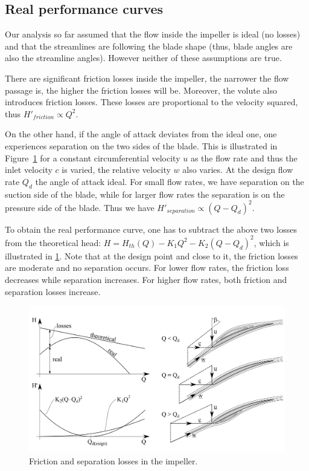 

\clearpage

\subsection{Real performance curves} \label{sec:real_performance_curves_turbomachines}

Our analysis so far assumed that the flow inside the impeller is ideal (no losses) and that the streamlines are following the blade shape (thus, blade angles are also the streamline angles). However neither of these assumptions are true.

There are significant friction losses inside the impeller, the narrower the flow passage is, the higher the friction losses will be. Moreover, the volute also introduces friction losses. These losses are proportional to the velocity squared, thus $H'_{friction} \propto Q^2$.

On the other hand, if the angle of attack deviates from the ideal one, one experiences separation on the two sides of the blade. This is illustrated in Figure~\ref{fig:real_perf_curve} for a constant circumferential velocity $u$ as the flow rate and thus the inlet velocity $c$ is varied, the relative velocity $w$ also varies. At the design flow rate $Q_d$ the angle of attack ideal. For small flow rates, we have separation on the suction side of the blade, while for larger flow rates the separation is on the pressure side of the blade. Thus we have $H'_{separation} \propto (Q-Q_d)^2$.

To obtain the real performance curve, one has to subtract the above two losses from the theoretical head: $H=H_{th}(Q)-K_1 Q^2-K_2 (Q-Q_d)^2$, which is illustrated in \ref{fig:real_perf_curve}. Note that at the design point and close to it, the friction losses are moderate and no separation occurs. For lower flow rates, the friction loss decreases while separation increases. For higher flow rates, both friction and separation losses increase.

\begin{figure}[ht]
\centering
\includegraphics{figs/HeadLosses.png}
\caption{\label{fig:real_perf_curve}Friction and separation losses in the impeller.}
\end{figure}

